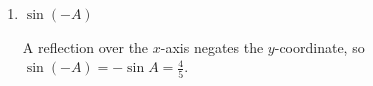 \documentclass{article}
\begin{document}
\begin{enumerate}
\begin{enumerate}[topsep=0pt]
\begin{enumerate}
    \item 
    \begin{problem}
        $\sin(-A)$
    \end{problem}
    \pspace{\vfill}

    \begin{solution}
        A reflection over the $x$-axis negates the $y$-coordinate, so $\sin(-A)=-\sin A = \frac{4}{5}$.
    \end{solution}
\end{enumerate}


  \end{enumerate}

  \pspace{\newpage}






\end{enumerate}
\end{document}
